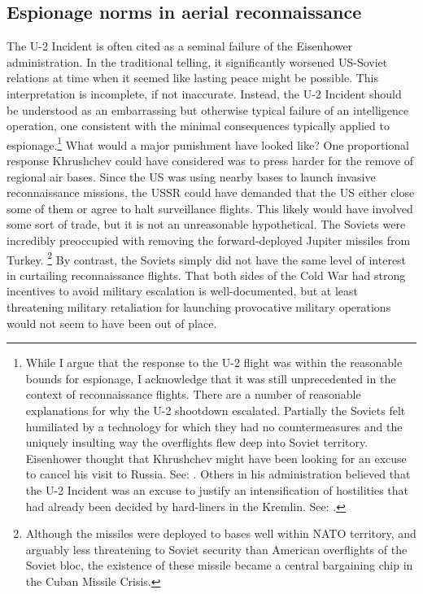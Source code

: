 \documentclass[14pt]{extarticle}
\begin{document}
\subsection{Espionage norms in aerial reconnaissance}
The U-2 Incident is often cited as a seminal failure of the Eisenhower administration. In the traditional telling, it significantly worsened US-Soviet relations at time when it seemed like lasting peace might be possible. This interpretation is incomplete, if not inaccurate. Instead, the U-2 Incident should be understood as an embarrassing but otherwise typical failure of an intelligence operation, one consistent with the minimal consequences typically applied to espionage.\footnote{While I argue that the response to the U-2 flight was within the reasonable bounds for espionage, I acknowledge that it was still unprecedented in the context of reconnaissance flights. There are a number of reasonable explanations for why the U-2 shootdown escalated. Partially the Soviets felt humiliated by a technology for which they had no countermeasures and the uniquely insulting way the overflights flew deep into Soviet territory. Eisenhower thought that Khrushchev might have been looking for an excuse to cancel his visit to Russia. See: \cite[p.~555]{eisenhower_waging_1965}. Others in his administration believed that the U-2 Incident was an excuse to justify an intensification of hostilities that had already been decided by hard-liners in the Kremlin. See: \cite[p.~328]{kistiakowsky_scientist_1976}.} What would a major punishment have looked like? One proportional response Khrushchev could have considered was to press harder for the remove of regional air bases. Since the US was using nearby bases to launch invasive reconnaissance missions, the USSR could have demanded that the US either close some of them or agree to halt surveillance flights. This likely would have involved some sort of trade, but it is not an unreasonable hypothetical. The Soviets were incredibly preoccupied with removing the forward-deployed Jupiter missiles from Turkey. \footnote{Although the missiles were deployed to bases well within NATO territory, and arguably less threatening to Soviet security than American overflights of the Soviet bloc, the existence of these missile became a central bargaining chip in the Cuban Missile Crisis.} By contrast, the Soviets simply did not have the same level of interest in curtailing reconnaissance flights. That both sides of the Cold War had strong incentives to avoid military escalation is well-documented, but at least threatening military retaliation for launching provocative military operations would not seem to have been out of place.
\end{document}
